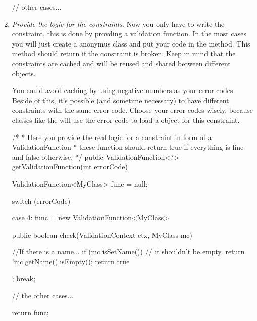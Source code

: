 \begin{enumerate}
\begin{example}[style=java, title={Select error codes}]
{{    // other cases...
    
    }
  }
\end{example}

\item \emph{Provide the logic for the constraints}.  Now you only have to
  write the constraint, this is done by provding a validation function. In
  the most cases you will just create a anonymus class and put your code in
  the  method. This method should return  if the
  constraint is broken. Keep in mind that the constraints are cached and will
  be reused and shared between different  objects.

  You could avoid caching by using negative numbers as your error codes.
  Beside of this, it's possible (and sometime necessary) to have different
  constraints with the same error code. Choose your error codes wisely,
  because classes like the  will use the error
  code to load a  object for this constraint.

\begin{example}[style=java, title={Select error codes}]
  /*
   * Here you provide the real logic for a constraint in form of a ValidationFunction
   * these function should return true if everything is fine and false otherwise.
   */
  public ValidationFunction<?> getValidationFunction(int errorCode) {
  	ValidationFunction<MyClass> func = null;
  	
  	switch (errorCode){
  	case 4:
  		func  = new ValidationFunction<MyClass> {
  		
  			public boolean check(ValidationContext ctx, MyClass mc){
  			
  				//If there is a name...
  				if (mc.isSetName())
  				{
  					// it shouldn't be empty.
  					return !mc.getName().isEmpty();
  				}
  				return true
  			}
  		};
  		break;
  		
  	// the other cases...
  	
  	}
  	
    return func;
  }
\end{example}

\end{enumerate}